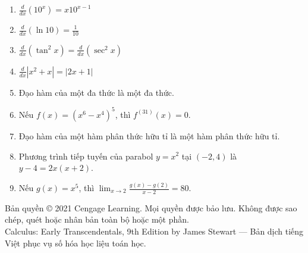 \begin{minipage}[t]{0.485\textwidth}
\begin{enumerate}[label=\textbf{\arabic*.}, leftmargin=14pt, itemsep=5.5pt, topsep=0pt, start=7]
    \item $\displaystyle \frac{d}{dx}(10^x) = x 10^{x-1}$

    \item $\displaystyle \frac{d}{dx}(\ln 10) = \frac{1}{10}$

    \item $\displaystyle \frac{d}{dx}(\tan^2 x) = \frac{d}{dx}(\sec^2 x)$

    \item $\displaystyle \frac{d}{dx}|x^2 + x| = |2x + 1|$

    \item Đạo hàm của một đa thức là một đa thức.

    \item Nếu $f(x) = (x^6 - x^4)^5$, thì $f^{(31)}(x) = 0$.

    \item Đạo hàm của một hàm phân thức hữu tỉ là một hàm phân thức hữu tỉ.

    \item Phương trình tiếp tuyến của parabol $y = x^2$ tại $(-2, 4)$ là $y - 4 = 2x(x + 2)$.

    \item Nếu $g(x) = x^5$, thì $\displaystyle \lim_{x \to 2}\frac{g(x) - g(2)}{x - 2} = 80$.
\end{enumerate}
\end{minipage}

\vfill
\begin{center}
    \fontsize{6.5}{8}\selectfont\color{stewartgray}
    Bản quyền © 2021 Cengage Learning. Mọi quyền được bảo lưu. Không được sao chép, quét hoặc nhân bản toàn bộ hoặc một phần.\\
    Calculus: Early Transcendentals, 9th Edition by James Stewart --- Bản dịch tiếng Việt phục vụ số hóa học liệu toán học.
\end{center}
